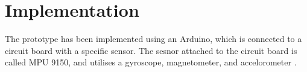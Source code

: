 \chapter{Implementation}

The prototype has been implemented using an Arduino, which is connected to a circuit board with a specific sensor. 
The sesnor attached to the circuit board is called MPU 9150, and utilises a gyroscope, magnetometer, and accelorometer \citep{MPU}.